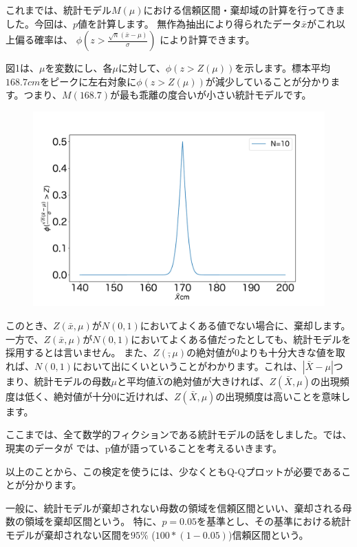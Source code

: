 これまでは、統計モデル$M(\mu)$における信頼区間・棄却域の計算を行ってきました。今回は、$p$値を計算します。
無作為抽出により得られたデータ$\bar{x}$がこれ以上偏る確率は、
$\phi(z>\frac{\sqrt{n}(\bar{x}-\mu)}{\sigma})$
により計算できます。

図1は、$\mu$を変数にし、各$\mu$に対して、$\phi(z>Z(\mu))$を示します。標本平均$168.7cm$をピークに左右対象に$\phi(z>Z(\mu))$が減少していることが分かります。つまり、$M(168.7)$が最も乖離の度合いが小さい統計モデルです。
\begin{figure}
\begin{center}
   \includegraphics[width=15cm]{./image/04_/p_cm.pdf}
 \end{center}
\end{figure}




このとき、$Z(\bar{x},\mu)$が$N(0,1)$においてよくある値でない場合に、棄却します。
一方で、$Z(\bar{x},\mu)$が$N(0,1)$においてよくある値だったとしても、統計モデルを採用するとは言いません。
また、$Z(\bar,\mu)$の絶対値が$0$よりも十分大きな値を取れば、$N(0,1)$において出にくいということがわかります。これは、$|\bar{X}-\mu|$つまり、統計モデルの母数$\mu$と平均値$\bar{X}$の絶対値が大きければ、$Z(\bar{X},\mu)$の出現頻度は低く、絶対値が十分$0$に近ければ、$Z(\bar{X},\mu)$の出現頻度は高いことを意味します。

ここまでは、全て数学的フィクションである統計モデルの話をしました。では、現実のデータが
では、p値が語っていることを考えるいきます。


以上のことから、この検定を使うには、少なくともQ-Qプロットが必要であることが分かります。


一般に、統計モデルが棄却されない母数の領域を信頼区間といい、棄却される母数の領域を棄却区間という。
特に、$p=0.05$を基準とし、その基準における統計モデルが棄却されない区間を$95\%$ ($100*(1-0.05)$)信頼区間という。


